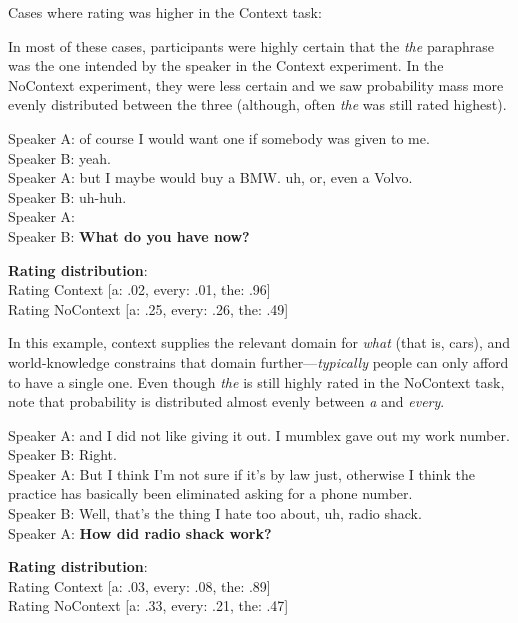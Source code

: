 \documentclass[12pt,letterpaper,table,svgnames,dvipsnames]{article}
\begin{document}
Cases where rating was higher in the Context task:

In most of these cases, participants were highly certain that the \emph{the} paraphrase was the one intended by the speaker in the Context experiment. In the NoContext experiment, they were less certain and we saw probability mass more evenly distributed between the three (although, often \emph{the} was still rated highest).

\begin{exe}
\ex {}
    \begin{xlist}
    \ex {}
    Speaker A: of course I would want one if somebody was given to me.\\
    Speaker B: yeah.\\
    Speaker A: but I maybe would buy a BMW. uh, or, even a Volvo.\\
    Speaker B: uh-huh.\\
    Speaker A: \\
    Speaker B: \textbf{What do you have now?}
    
    \ex \textbf{Rating distribution}:\\
    Rating Context [a: .02, every: .01, the: .96]\\
    Rating NoContext [a: .25, every: .26, the: .49]
    \end{xlist}
\end{exe}

In this example, context supplies the relevant domain for \emph{what} (that is, cars), and world-knowledge constrains that domain further---\emph{typically} people can only afford to have a single one. Even though \emph{the} is still highly rated in the NoContext task, note that probability is distributed almost evenly between \emph{a} and \emph{every}. 


\begin{exe}
\ex {}
    \begin{xlist}
    \ex {}
    Speaker A: and I did not like giving it out. I mumblex gave out my work number.\\
    Speaker B: Right.\\
    Speaker A: But I think I'm not sure if it's by law just, otherwise I think the practice has basically been eliminated asking for a phone number.\\
    Speaker B: Well, that's the thing I hate too about, uh, radio shack. \\
    Speaker A: \textbf{How did radio shack work?}
    
    \ex \textbf{Rating distribution}:\\
    Rating Context [a: .03, every: .08, the: .89]\\
    Rating NoContext [a: .33, every: .21, the: .47]
    \end{xlist}
\end{exe}
\end{document}
